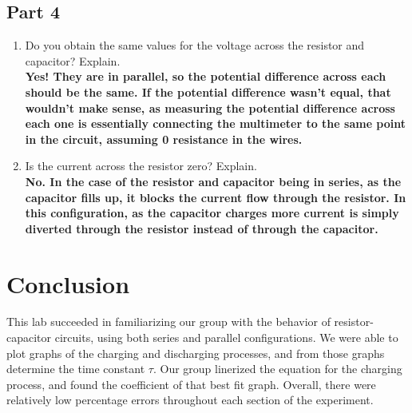\documentclass[titlepage]{article}
\begin{document}
    \subsection{Part 4}
    \begin{enumerate}
        \item Do you obtain the same values for the voltage across the resistor and capacitor? Explain.\\ 
            \textbf{Yes! They are in parallel, so the potential difference across each should be the same. If the potential difference wasn’t equal, that wouldn’t make sense, as measuring the potential difference across each one is essentially connecting the multimeter to the same point in the circuit, assuming 0 resistance in the wires.}
        \item Is the current across the resistor zero? Explain.\\ 
            \textbf{No. In the case of the resistor and capacitor being in series, as the capacitor fills up, it blocks the current flow through the resistor. In this configuration, as the capacitor charges more current is simply diverted through the resistor instead of through the capacitor.}



    \end{enumerate}

	\section{Conclusion}
    This lab succeeded in familiarizing our group with the behavior of resistor-capacitor circuits, using both series and parallel configurations.  We were able to plot graphs of the charging and discharging processes, and from those graphs determine the time constant $\tau$. Our group linerized the equation for the charging process, and found the coefficient of that best fit graph. Overall, there were relatively low percentage errors throughout each section of the experiment.
\end{document}
